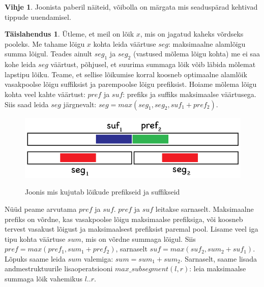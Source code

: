 \documentclass{trkut}
\theoremstyle{definition}
\newtheorem*{vihje}{Vihje}
\newtheorem*{solution}{Täislahendus}
\begin{document}
\begin{vihje}
Joonista paberil näiteid, võibolla on märgata mis seaduspärad kehtivad tippude uuendamisel.
\end{vihje}

\begin{solution}
Ütleme, et meil on lõik $x$, mis on jagatud kaheks võrdseks pooleks.
Me tahame lõigu $x$ kohta leida väärtuse $seg$: maksimaalne alamlõigu summa lõigul. Teades ainult $seg_1$ ja $seg_2$ (vastused mõlema lõigu kohta) me ei saa kohe leida $seg$ väärtust, põhjusel, et suurima summaga lõik võib läbida mõlemat lapstipu lõiku.
Teame, et sellise lõikumise korral koosneb optimaalne alamlõik vasakpoolse lõigu suffiksist ja parempoolse lõigu prefiksist.
Hoiame mõlema lõigu kohta veel kahte väärtust: $pref$ ja $suf$: prefiks ja suffiks maksimaalse väärtusega. Siis saad leida $seg$ järgnevalt: $seg=max(seg_1,seg_2,suf_1+pref_2)$.


\begin{figure}[H]%
    \includegraphics[width=12cm]{sumseg.png}%
    \caption{Joonis mis kujutab lõikude prefikseid ja suffikseid}%
    \label{joonis}%
\end{figure}

Nüüd peame arvutama $pref$ ja $suf$.
$pref$ ja $suf$ leitakse sarnaselt.
Maksimaalne prefiks on võrdne, kas vasakpoolse lõigu maksimaalse prefiksiga, või koosneb tervest vasakust lõigust ja maksimaalsest prefiksist paremal pool.
Lisame veel iga tipu kohta väärtuse $sum$, mis on võrdne summaga lõigul. Siis $pref=max(pref_1,sum_1+pref_2)$, sarnaselt $suf=max(suf_2,sum_2+suf_1)$.
Lõpuks saame leida $sum$ valemiga: $sum=sum_1+sum_2$.
Sarnaselt, saame lisada andmestruktuurile lisaoperatsiooni $max\_subsegment(l,r)$: leia maksimaalse summaga lõik vahemikus $l..r$.
\end{solution}
\end{document}
